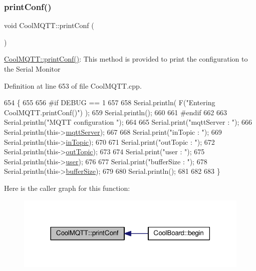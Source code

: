 \subsubsection{\texorpdfstring{print\+Conf()}{printConf()}}
{\footnotesize\ttfamily void Cool\+M\+Q\+T\+T\+::print\+Conf (\begin{DoxyParamCaption}{ }\end{DoxyParamCaption})}

\hyperlink{class_cool_m_q_t_t_a40553a0ad4b5ecf1cb4411ab54ca85fb}{Cool\+M\+Q\+T\+T\+::print\+Conf()}\+: This method is provided to print the configuration to the Serial Monitor 

Definition at line 653 of file Cool\+M\+Q\+T\+T.\+cpp.


\begin{DoxyCode}
654 \{
655 
656 \textcolor{preprocessor}{#if DEBUG == 1 }
657 
658     Serial.println( F(\textcolor{stringliteral}{"Entering CoolMQTT.printConf()"}) );
659     Serial.println();   
660 
661 \textcolor{preprocessor}{#endif}
662     
663     Serial.println(\textcolor{stringliteral}{"MQTT configuration "});
664 
665     Serial.print(\textcolor{stringliteral}{"mqttServer : "});
666     Serial.println(this->\hyperlink{class_cool_m_q_t_t_ab8bb951f87ddbf92db74c2ad16a3e53e}{mqttServer});
667 
668     Serial.print(\textcolor{stringliteral}{"inTopic : "});
669     Serial.println(this->\hyperlink{class_cool_m_q_t_t_a4492f52a441e83cc5151010317fdb52d}{inTopic});
670 
671     Serial.print(\textcolor{stringliteral}{"outTopic : "});
672     Serial.println(this->\hyperlink{class_cool_m_q_t_t_a109c786a17b463f9eeba046194279522}{outTopic});
673 
674     Serial.print(\textcolor{stringliteral}{"user : "});
675     Serial.println(this->\hyperlink{class_cool_m_q_t_t_a8cd47e45d457f908d4b4390b35aaee83}{user});
676 
677     Serial.print(\textcolor{stringliteral}{"bufferSize : "});
678     Serial.println(this->\hyperlink{class_cool_m_q_t_t_a7f3cf26b51d6770f216e42c5ef13ca9f}{bufferSize});
679 
680     Serial.println();
681 
682 
683 \}
\end{DoxyCode}
Here is the caller graph for this function\+:\nopagebreak
\begin{figure}[H]
\begin{center}
\leavevmode
\includegraphics[width=318pt]{d0/dd0/class_cool_m_q_t_t_a40553a0ad4b5ecf1cb4411ab54ca85fb_icgraph}
\end{center}
\end{figure}
\mbox{\label{class_cool_m_q_t_t_ace977b3e90ab14b1199fe5c4fb0a13ec}} 
